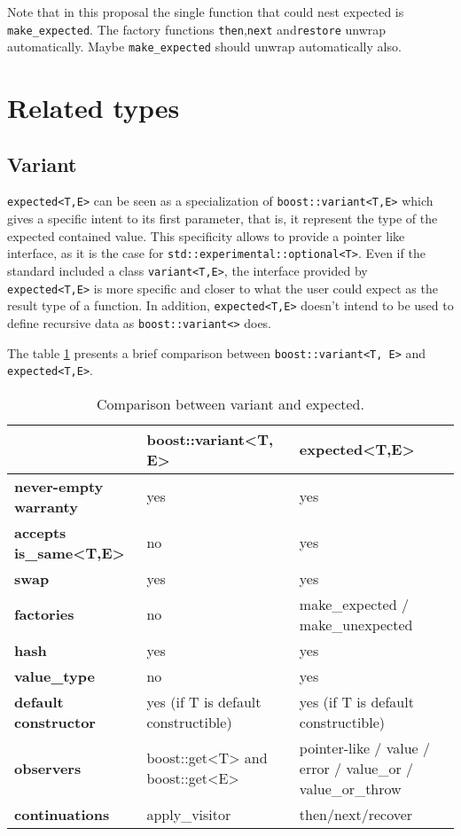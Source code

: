 \documentclass[a4paper,10pt]{article}
\newcommand{\cpp}[1]{\lstinline{#1}}
\begin{document}
Note that in this proposal the single function that could nest expected is \cpp{make_expected}. The factory functions \cpp{then},\cpp{next} and\cpp{restore} unwrap automatically. Maybe  \cpp{make_expected} should unwrap automatically also.

\section{Related types}

\subsection{Variant}

\cpp{expected<T,E>} can be seen as a specialization of  \cpp{boost::variant<T,E>} which gives a specific intent to its first parameter, that is, it represent the type of the expected contained value. This specificity allows to provide a pointer like interface, as it is the case for \cpp{std::experimental::optional<T>}. Even if the standard included a class  \cpp{variant<T,E>}, the interface provided by \cpp{expected<T,E>} is more specific and closer to what the user could expect as the result type of a function. In addition, \cpp{expected<T,E>} doesn't intend to be used to define recursive data as \cpp{boost::variant<>} does.

The table \ref{comp-variant} presents a brief comparison between \cpp{boost::variant<T, E>} and \cpp{expected<T,E>}.

\begin{table}
\bgroup
\def\arraystretch{1.5}
\begin{tabular}
{|l|>{\raggedright\arraybackslash}p{6cm}|>{\raggedright\arraybackslash}p{6cm}|}
\hline
                    & \textbf{boost::variant<T, E>} & \textbf{expected<T,E>}  \\
\hline
\textbf{never-empty warranty} & yes & yes \\
\hline
\textbf{accepts is_same<T,E>} & no & yes \\
\hline
\textbf{swap} & yes & yes \\
\hline
\textbf{factories} & no & make\_expected / make\_unexpected  \\
\hline
\textbf{hash} & yes & yes  \\
\hline
\textbf{value_type} & no & yes  \\
\hline
\textbf{default constructor} & yes (if T is default constructible) & yes (if T is default constructible)  \\
\hline
\textbf{observers} & boost::get<T> and boost::get<E> & pointer-like / value / error / value_or / value_or_throw \\
\hline
\textbf{continuations} & apply_visitor & then/next/recover  \\
\hline
\end{tabular}
\egroup
\caption{Comparison between variant and expected.}
\label{comp-variant}
\end{table}
\end{document}
